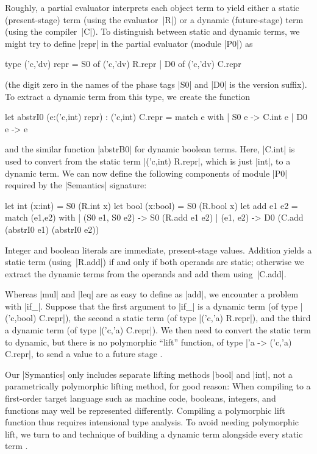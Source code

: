 Roughly, a partial evaluator interprets each object term to yield either
a static (present-stage) term (using the evaluator~|R|) or
a dynamic (future-stage) term (using the compiler~|C|).  To
distinguish between static and dynamic terms, we might try to define
|repr| in the partial evaluator (module |P0|) as
\begin{code}
type ('c,'dv) repr = S0 of ('c,'dv) R.repr | D0 of ('c,'dv) C.repr
\end{code}
(the digit zero in the names of the phase tags |S0| and |D0| is the
version suffix).
To extract a dynamic term from this type, we create the function
\begin{code}
let abstrI0 (e:('c,int) repr) : ('c,int) C.repr =
  match e with
  | S0 e -> C.int e
  | D0 e -> e
\end{code}
and the similar function |abstrB0| for dynamic boolean terms. Here, 
|C.int| is used to convert from the static term |('c,int) R.repr|, 
which is just |int|, to a dynamic term. We can now define the following
components of module |P0| required by the |Semantics| signature:
\begin{code}
let int  (x:int)  = S0 (R.int x)
let bool (x:bool) = S0 (R.bool x)
let add e1 e2 = 
  match (e1,e2) with
  | (S0 e1, S0 e2) -> S0 (R.add e1 e2)
  | (e1, e2)       -> D0 (C.add (abstrI0 e1) (abstrI0 e2))
\end{code}
Integer and boolean literals are immediate, present-stage
values. Addition yields a static term (using~|R.add|) if and only 
if both operands are static; otherwise we extract the dynamic terms 
from the operands and add them using~|C.add|.

Whereas |mul| and |leq| are as easy to define as |add|, we encounter
a problem with |if_|.  Suppose that the first argument to |if_| 
is a dynamic term
(of type |('c,bool) C.repr|), the second a static term 
(of type |('c,'a) R.repr|), and the third a
dynamic term (of type |('c,'a) C.repr|). We then need to convert
the static term to dynamic, but there is no polymorphic ``lift''
function, of type |'a -> ('c,'a) C.repr|, to send a value to a future stage
\citep{xi-guarded,WalidPOPL03}.
\begin{comment}
(By the way, if we
were to add polymorphic \texttt{lift} to the type class
\texttt{Symantics repr}, then \texttt{repr} would become an instance of
\texttt{Applicative} and thus \texttt{Functor}:\texttt{ fmap
f = app (lift f)~}.)
\end{comment}

Our |Symantics| only includes separate lifting methods |bool| and
|int|, not a parametrically polymorphic lifting method, for good reason:
When compiling to a first-order target language such as machine code,
booleans, integers, and functions may well be represented differently.
Compiling a polymorphic lift function thus requires intensional type
analysis.  To avoid needing polymorphic lift, we turn to
 and  technique of
building a dynamic term alongside every static term \citep{sumii-hybrid}.


